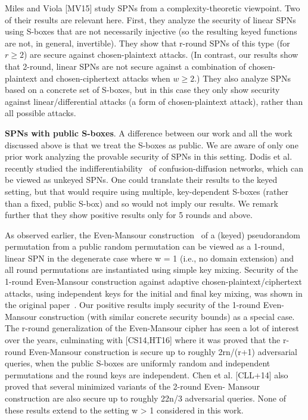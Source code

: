 Miles and Viola [MV15] study SPNs from a complexity-theoretic viewpoint.
Two of their results are relevant here. First, they analyze the security of linear
SPNs using S-boxes that are not necessarily injective (so the resulting keyed
functions are not, in general, invertible). They show that r-round SPNs of this
type (for $r\geq 2$) are secure against chosen-plaintext attacks. (In contrast, our
results show that 2-round, linear SPNs are not secure against a combination of
chosen-plaintext and chosen-ciphertext attacks when $w\geq 2$.) They also analyze
SPNs based on a concrete set of S-boxes, but in this case they only show security
against linear/differential attacks (a form of chosen-plaintext attack), rather
than all possible attacks.


{\bf SPNs with public S-boxes}. A difference between our work and all the work
discussed above is that we treat the S-boxes as public. We are aware of only
one prior work analyzing the provable security of SPNs in this setting. Dodis
et al.~\cite{EC:DSSL16} recently studied the indifferentiability~\cite{TCC:MauRenHol04} of confusion-diffusion
networks, which can be viewed as unkeyed SPNs. One could translate
their results to the keyed setting, but that would require using multiple, key-dependent
S-boxes (rather than a fixed, public S-box) and so would not imply
our results. We remark further that they show positive results only for 5 rounds
and above.


As observed earlier, the Even-Mansour construction~\cite{JC:EveMan97} of a (keyed) pseudorandom permutation from a public random permutation can be viewed
as a 1-round, linear SPN in the degenerate case where w = 1 (i.e., no domain
extension) and all round permutations are instantiated using simple key mixing.
Security of the 1-round Even-Mansour construction against adaptive chosen-plaintext/ciphertext attacks, using independent keys for the initial and final key mixing, was shown in the original paper~\cite{JC:EveMan97}. Our positive results imply
security of the 1-round Even-Mansour construction (with similar concrete security
bounds) as a special case. The r-round generalization of the Even-Mansour
cipher has seen a lot of interest over the years, culminating with [CS14,HT16]
where it was proved that the r-round Even-Mansour construction is secure up to
roughly 2rn/(r+1) adversarial queries, when the public S-boxes are uniformly random
and independent permutations and the round keys are independent. Chen et
al. [CLL+14] also proved that several minimized variants of the 2-round Even-
Mansour construction are also secure up to roughly 22n/3 adversarial queries.
None of these results extend to the setting w > 1 considered in this work.





